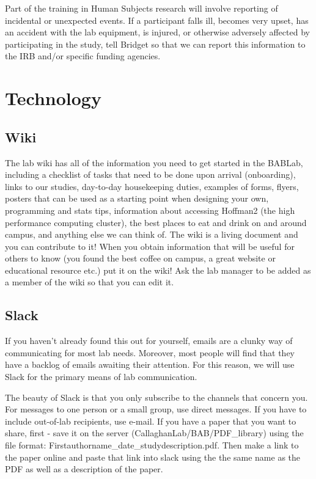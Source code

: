 \documentclass[]{book}
\begin{document}
Part of the training in Human Subjects research will involve reporting of incidental or unexpected events. If a participant falls ill, becomes very upset, has an accident with the lab equipment, is injured, or otherwise adversely affected by participating in the study, tell Bridget so that we can report this information to the IRB and/or specific funding agencies.

\hypertarget{technology}{%
\chapter{Technology}\label{technology}}

\hypertarget{wiki}{%
\section{Wiki}\label{wiki}}

The lab wiki has all of the information you need to get started in the BABLab, including a checklist of tasks that need to be done upon arrival (onboarding), links to our studies, day-to-day housekeeping duties, examples of forms, flyers, posters that can be used as a starting point when designing your own, programming and stats tips, information about accessing Hoffman2 (the high performance computing cluster), the best places to eat and drink on and around campus, and anything else we can think of. The wiki is a living document and you can contribute to it! When you obtain information that will be useful for others to know (you found the best coffee on campus, a great website or educational resource etc.) put it on the wiki! Ask the lab manager to be added as a member of the wiki so that you can edit it.

\hypertarget{slack}{%
\section{Slack}\label{slack}}

If you haven't already found this out for yourself, emails are a clunky way of communicating for most lab needs. Moreover, most people will find that they have a backlog of emails awaiting their attention. For this reason, we will use Slack for the primary means of lab communication.

The beauty of Slack is that you only subscribe to the channels that concern you. For messages to one person or a small group, use direct messages. If you have to include out-of-lab recipients, use e-mail. If you have a paper that you want to share, first - save it on the server (CallaghanLab/BAB/PDF\_library) using the file format: Firstauthorname\_date\_studydescription.pdf. Then make a link to the paper online and paste that link into slack using the the same name as the PDF as well as a description of the paper.
\end{document}
